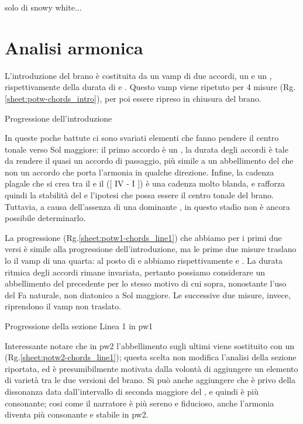 \documentclass[class=book, crop=false, oneside, 12pt]{standalone}
\begin{document}
    solo di snowy white...

    \section{Analisi armonica}
    \label{sec:03-harmony}
    L'introduzione del brano è costituita da un vamp di due accordi, un  e un , rispettivamente della durata di  e . Questo vamp viene ripetuto per 4 misure (Rg.\ref{sheet:potw-chords_intro}), per poi essere ripreso in chiusura del brano. 
    \begin{sheet}{Progressione dell'introduzione}
        \label{sheet:potw-chords_intro}
    \end{sheet}
    
    In queste poche battute ci sono svariati elementi che fanno pendere il centro tonale verso Sol maggiore: il primo accordo è un , la durata degli accordi è tale da rendere il  quasi un accordo di passaggio, più simile a un abbellimento del  che non un accordo che porta l'armonia in qualche direzione. Infine, la cadenza plagale che si crea tra il  e il  ([ IV - I ]) è una cadenza molto blanda, e rafforza quindi la stabilità del  e l'ipotesi che possa essere il centro tonale del brano. Tuttavia, a causa dell'assenza di una dominante , in questo stadio non è ancora possibile determinarlo.

    La progressione (Rg.\ref{sheet:potw1-chords_line1}) che abbiamo per i primi due versi  è simile alla progressione dell'introduzione, ma le prime due misure traslano lo il vamp di una quarta: al posto di  e  abbiamo rispettivamente  e . La durata ritmica degli accordi rimane invariata, pertanto possiamo considerare  un abbellimento del precedente  per lo stesso motivo di cui sopra, nonostante l'uso del Fa naturale, non diatonico a Sol maggiore. Le successive due misure, invece, riprendono il vamp non traslato.

    
    \begin{sheet}{Progressione della sezione Linea 1 in \acrshort{pw1}}
        \label{sheet:potw1-chords_line1}
    \end{sheet}
    
    Interessante notare che in \acrshort{pw2} l'abbellimento sugli ultimi  viene sostituito con un  (Rg.\ref{sheet:potw2-chords_line1}); questa scelta non modifica l'analisi della sezione riportata, ed è presumibilmente motivata dalla volontà di aggiungere un elemento di varietà tra le due versioni del brano. Si può anche aggiungere che  è privo della dissonanza data dall'intervallo di seconda maggiore del , e quindi è più consonante; cosi come il narratore  è più sereno e fiducioso, anche l'armonia diventa più consonante e stabile in \acrshort{pw2}.
\end{document}

